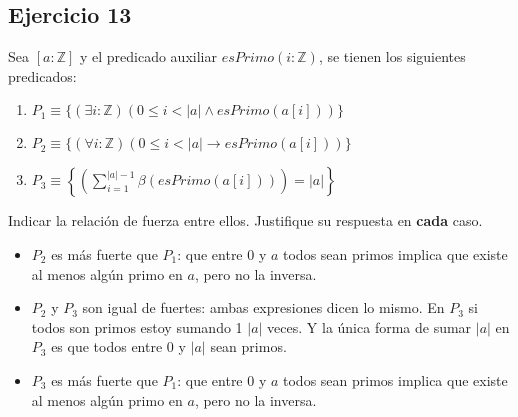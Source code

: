 \documentclass[10pt,a4paper]{article}
\begin{document}
\subsection*{Ejercicio 13}
Sea $[a : \mathbb{Z}]$ y el predicado auxiliar $esPrimo(i : \mathbb{Z})$, se tienen los siguientes predicados:
\begin{enumerate}
\item $P_{1}\equiv \{(\exists i : \mathbb{Z}) (0 \leq i < |a| \wedge esPrimo(a[i]))\}$
\item $P_{2} \equiv \{(\forall i : \mathbb{Z}) (0 \leq i < |a| \rightarrow esPrimo(a[i]))\}$
\item 
$P_{3}\equiv \left\lbrace \left(\sum_{i=1}^{|a|-1}  \beta(esPrimo(a[i]))\right)=|a| \right\rbrace $
\end{enumerate}
Indicar la relación de fuerza entre ellos. Justifique su respuesta en \textbf{cada} caso.
\begin{itemize}
\item $P_{2}$ es más fuerte que $P_{1}$: que entre 0 y $a$ todos sean primos implica que existe al menos algún primo en $a$, pero no la inversa.
\item $P_{2}$ y $P_{3}$ son igual de fuertes: ambas expresiones dicen lo mismo. En $P_{3}$ si todos son primos estoy sumando 1 $|a|$ veces. Y la única forma de sumar $|a|$ en $P_{3}$ es que todos entre 0 y $|a|$ sean primos.
\item $P_{3}$ es más fuerte que $P_{1}$: que entre 0 y $a$ todos sean primos implica que existe al menos algún primo en $a$, pero no la inversa.
\end{itemize}
\end{document}
